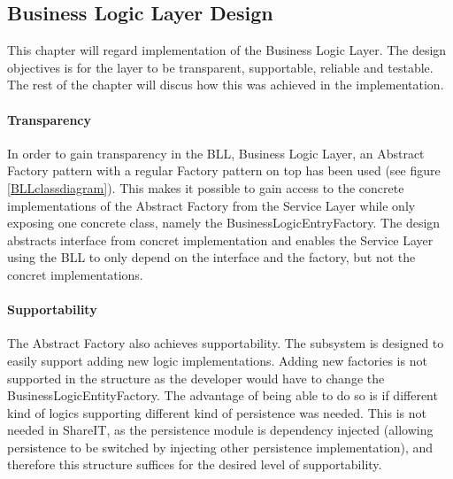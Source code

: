 \documentclass[../report.tex]{subfiles}
\begin{document}
\graphicspath{{img/}{../img/}}

\subsection{Business Logic Layer Design}

This chapter will regard implementation of the Business Logic Layer. The design objectives is for the layer to be transparent, supportable, reliable and testable. The rest of the chapter will discus how this was achieved in the implementation. 

\paragraph{Transparency}
In order to gain transparency in the BLL, Business Logic Layer, an Abstract Factory pattern with a regular Factory pattern on top has been used (see figure \ref{BLLclassdiagram}). This makes it possible to gain access to the concrete implementations of the Abstract Factory from the Service Layer while only exposing one concrete class, namely the BusinessLogicEntryFactory. The design abstracts interface from concret implementation and enables the Service Layer using the BLL to only depend on the interface and the factory, but not the concret implementations.





\paragraph{Supportability} The Abstract Factory also achieves supportability.
The subsystem is designed to easily support adding new logic
implementations. Adding new factories is not supported in the structure as the
developer would have to change the BusinessLogicEntityFactory. The advantage
of being able to do so is if different kind of logics supporting different
kind of persistence was needed. This is not needed in ShareIT, as the
persistence module is dependency injected (allowing persistence to be switched
by injecting other persistence implementation), and therefore this structure
suffices for the desired level of supportability.
\end{document}
